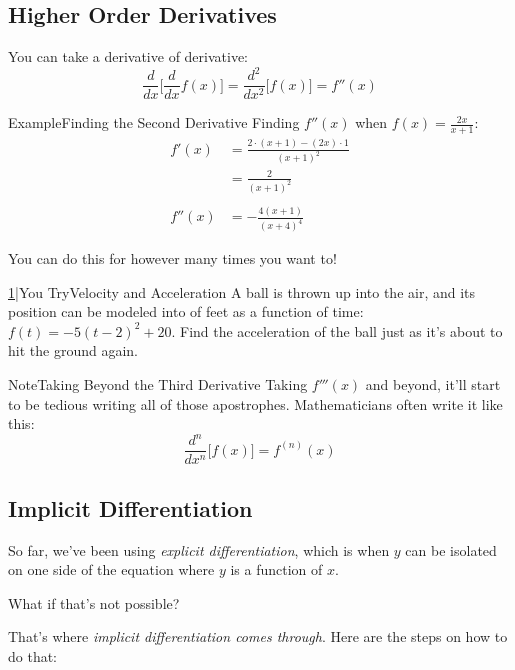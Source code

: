 \documentclass{MathNotes}
\newenvironment{example}[1]
{\begin{BlueBox}{Example}{#1}}{\end{BlueBox}}
\newenvironment{note}[1]
{\begin{YellowBox}{Note}{#1}}{\end{YellowBox}}
\newenvironment{practice}[2]
{\begin{PurpleBox}{\texorpdfstring{#1}\Big|You Try}{#2}}{\end{PurpleBox}}
\begin{document}
\newpage
\subsection{Higher Order Derivatives}
You can take a derivative of derivative:
\begin{displaymath}
    \frac{d}{dx}\big[\frac{d}{dx}f(x)\big]=\frac{d^2}{dx^2}\big[f(x)\big]
    =f''(x)
\end{displaymath}
\begin{example}{Finding the Second Derivative}
    Finding $f''(x)$ when $f(x)=\frac{2x}{x+1}$:
    \begin{align*}
        f'(x)&=\frac{2\cdot(x+1)-(2x)\cdot 1}{(x+1)^2}\\
        &=\frac{2}{(x+1)^2}\\
        \\
        f''(x)&=-\frac{4(x+1)}{(x+4)^4}
    \end{align*}
\end{example}
You can do this for however many times you want to!
\begin{practice}{\hyperref[ans:2.3.1-1]{1}}{Velocity and Acceleration}
    \label{prac:2.3.1-1}
    A ball is thrown up into the air, and its position can be modeled into
    of feet as a function of time: $f(t)=-5(t-2)^2+20$. Find the acceleration
    of the ball just as it's about to hit the ground again.
\end{practice}
\begin{note}{Taking Beyond the Third Derivative}
    Taking $f'''(x)$ and beyond, it'll start to be tedious writing all of those
    apostrophes. Mathematicians often write it like this:
    $$\frac{d^n}{dx^n}\big[f(x)\big]=f^{(n)}(x)$$
\end{note}

\subsection{Implicit Differentiation}
So far, we've been using \textit{explicit differentiation}, which is when $y$
can be isolated on one side of the equation where $y$ is a function of $x$.

What if that's not possible?

That's where \textit{implicit differentiation comes through}. Here are the 
steps on how to do that:
\end{document}
